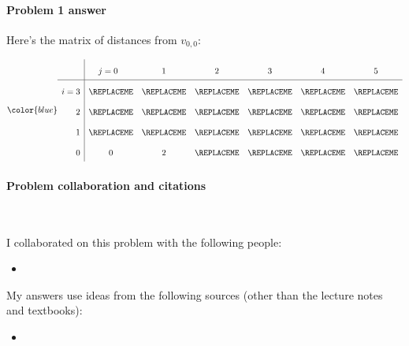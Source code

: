 \paragraph{Problem 1 answer}

Here's the matrix of distances from $v_{0,0}$:

\[\renewcommand{\arraystretch}{2}\color{blue}
  \begin{array}{r|cccccc}
         &       j=0~~     &   ~~~1~~~     &      ~~~2~~~  &   ~~~3~~~    &   ~~~4~~~     &   ~~~5~~~  \\ \hline
    i=3 & \REPLACEME & \REPLACEME & \REPLACEME & \REPLACEME & \REPLACEME & \REPLACEME
    \\
    2 & \REPLACEME & \REPLACEME & \REPLACEME & \REPLACEME & \REPLACEME & \REPLACEME
    \\
    1 & \REPLACEME & \REPLACEME & \REPLACEME & \REPLACEME & \REPLACEME & \REPLACEME
    \\
    0 & 0    &   2  & \REPLACEME & \REPLACEME & \REPLACEME & \REPLACEME
  \end{array}
\]
\vfill \vfill

\paragraph{Problem  collaboration and citations}~

I collaborated on this problem with the following people:
\begin{blue}
  \begin{itemize}
  \item \REPLACEME                    %
  \end{itemize}
\end{blue}

My answers use ideas from the following sources (other than the lecture notes and textbooks): 
\begin{blue}
  \begin{itemize}
  \item \REPLACEME                    %
  \end{itemize}
\end{blue}



